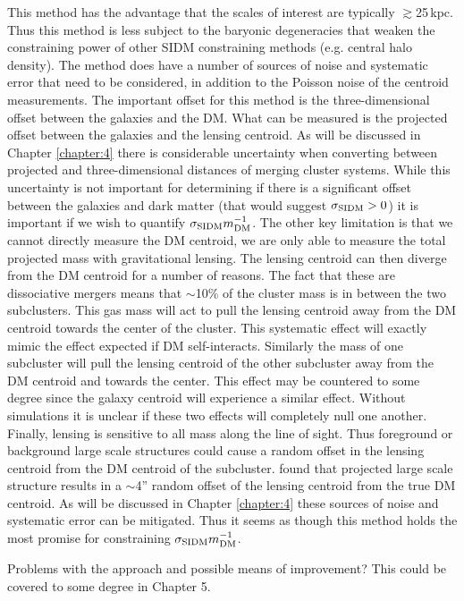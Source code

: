 This method has the advantage that the scales of interest are typically $\gtrsim$25\,kpc.
Thus this method is less subject to the baryonic degeneracies that weaken the constraining power of other SIDM constraining methods (e.g. central halo density).
The method does have a number of sources of noise and systematic error that need to be considered, in addition to the Poisson noise of the centroid measurements.
The important offset for this method is the three-dimensional offset between the galaxies and the DM.
What can be measured is the projected offset between the galaxies and the lensing centroid.
As will be discussed in Chapter \ref{chapter:4} there is considerable uncertainty when converting between projected and three-dimensional distances of merging cluster systems.
While this uncertainty is not important for determining if there is a significant offset between the galaxies and dark matter (that would suggest $\sigma_{\rm SIDM}>0$) it is important if we wish to quantify $\sigma_{\rm SIDM}m^{-1}_{\rm DM}$.
The other key limitation is that we cannot directly measure the DM centroid, we are only able to measure the total projected mass with gravitational lensing.
The lensing centroid can then diverge from the DM centroid for a number of reasons.
The fact that these are dissociative mergers means that $\sim$10\% of the cluster mass is in between the two subclusters.
This gas mass will act to pull the lensing centroid away from the DM centroid towards the center of the cluster.
This systematic effect will exactly mimic the effect expected if DM self-interacts.
Similarly the mass of one subcluster will pull the lensing centroid of the other subcluster away from the DM centroid and towards the center.
This effect may be countered to some degree since the galaxy centroid will experience a similar effect.
Without simulations it is unclear if these two effects will completely null one another.
Finally, lensing is sensitive to all mass along the line of sight.
Thus foreground or background large scale structures could cause a random offset in the lensing centroid from the DM centroid of the subcluster.
\citet{Dietrich:2011gs} found that projected large scale structure results in a $\sim$4'' random offset of the lensing centroid from the true DM centroid.
As will be discussed in Chapter \ref{chapter:4} these sources of noise and systematic error can be mitigated.
Thus it seems as though this method holds the most promise for constraining $\sigma_{\rm SIDM}m^{-1}_{\rm DM}$.

Problems with the \citep{Randall:2008hs} approach and possible means of improvement? This could be covered to some degree in Chapter 5.

